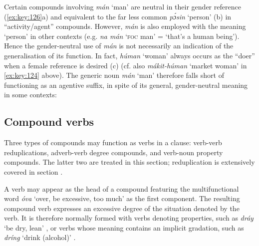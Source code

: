 Certain compounds involving \textit{mán} ‘man’ are neutral in their gender reference (\ref{ex:key:126}a) and equivalent to the far less common \textit{pɔ́sin} ‘person’ (b) in “activity/agent” compounds. However, \textit{mán} is also employed with the meaning ‘person’ in other contexts (e.g. \textit{na mán} ‘\textsc{foc} man’ = ‘that’s a human being’). Hence the gender-neutral use of \textit{mán} is not necessarily an indication of the generalisation of its function. In fact, \textit{húman} ‘woman’ always occurs as the “doer” when a female reference is desired (c) (cf. also \textit{mákit-húman} ‘market woman’ in \ref{ex:key:124} above). The generic noun \textit{mán} ‘man’ therefore falls short of functioning as an agentive suffix, in spite of its general, gender-neutral meaning in some contexts: 

\subsection{Compound verbs}\label{sec:4.4.3}

Three types of compounds may function as verbs in a clause: verb-verb reduplications, adverb-verb degree compounds, and verb-noun property compounds. The latter two are treated in this section; reduplication is extensively covered in section .


A verb may appear as the head of a compound featuring the multifunctional word \textit{óva} ‘over, be excessive, too much’ as the first component. The resulting compound verb expresses an excessive degree of the situation denoted by the verb. It is therefore normally formed with verbs denoting properties, such as \textit{dráy} ‘be dry, lean’ , or verbs whose meaning contains an implicit gradation, such as \textit{dríng} ‘drink (alcohol)’ . 



